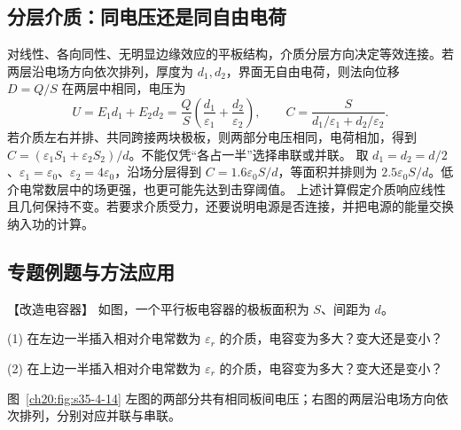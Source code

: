 {%
\subsection{分层介质：同电压还是同自由电荷}
对线性、各向同性、无明显边缘效应的平板结构，介质分层方向决定等效连接。若两层沿电场方向依次排列，厚度为 $d_1,d_2$，界面无自由电荷，则法向位移 $D=Q/S$ 在两层中相同，电压为
\[
 U=E_1d_1+E_2d_2=\frac QS\left(\frac{d_1}{\varepsilon_1}+\frac{d_2}{\varepsilon_2}\right),\qquad
 C=\frac S{d_1/\varepsilon_1+d_2/\varepsilon_2}.
\]
若介质左右并排、共同跨接两块极板，则两部分电压相同，电荷相加，得到
$C=(\varepsilon_1S_1+\varepsilon_2S_2)/d$。不能仅凭“各占一半”选择串联或并联。
取 $d_1=d_2=d/2$、$\varepsilon_1=\varepsilon_0$、$\varepsilon_2=4\varepsilon_0$，沿场分层得到 $C=1.6\varepsilon_0S/d$，等面积并排则为 $2.5\varepsilon_0S/d$。低介电常数层中的场更强，也更可能先达到击穿阈值。
上述计算假定介质响应线性且几何保持不变。若要求介质受力，还要说明电源是否连接，并把电源的能量交换纳入功的计算。


\subsection{专题例题与方法应用}

\begin{origexamplebox}{【改造电容器】}\label{ch20:ex:s35-4-4}
如图，一个平行板电容器的极板面积为 $S$、间距为 $d$。

(1) 在左边一半插入相对介电常数为 $\varepsilon_r$ 的介质，电容变为多大？变大还是变小？

(2) 在上边一半插入相对介电常数为 $\varepsilon_r$ 的介质，电容变为多大？变大还是变小？
\emModifiedQuestion{}\label{ch20:fig:em-modified-question}
\end{origexamplebox}\par\nopagebreak[4]

图~\ref{ch20:fig:s35-4-14} 左图的两部分共有相同板间电压；右图的两层沿电场方向依次排列，分别对应并联与串联。

\par\noindent\begin{minipage}{\linewidth}
\modifiedCapacitorFigure
{}\label{ch20:fig:s35-4-14}
\end{minipage}\par\medskip

\begin{xesolution}
\ThAModifiedCapacitor


\end{xesolution}}
